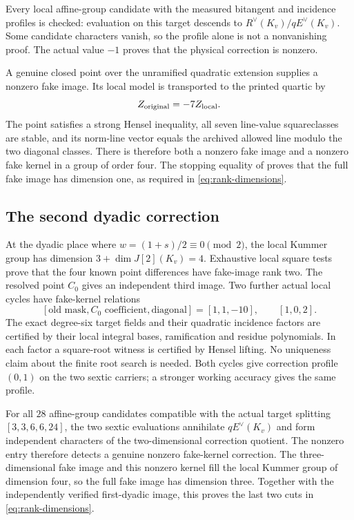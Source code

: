 Every local affine-group candidate with the measured bitangent and
incidence profiles is checked: evaluation on this target descends to
$R^\vee(K_v)/qE^\vee(K_v)$.  Some candidate characters vanish, so the
profile alone is not a nonvanishing proof.  The actual value $-1$ proves
that the physical correction is nonzero.

A genuine closed point over the unramified quadratic extension supplies
a nonzero fake image.  Its local model is transported to the printed
quartic by
\[
                         Z_{\rm original}=-7Z_{\rm local}.
\]
The point satisfies a strong Hensel inequality, all seven line-value
squareclasses are stable, and its norm-line vector equals the archived
allowed line modulo the two diagonal classes.  There is therefore both a
nonzero fake image and a nonzero fake kernel in a group of order four.
The stopping equality of \cite[Lemma~A.24(b)]{BPS} proves that the full
fake image has dimension one, as required in
\eqref{eq:rank-dimensions}.

\subsection{The second dyadic correction}

At the dyadic place where $w=(1+s)/2\equiv0\pmod2$, the local Kummer
group has dimension $3+\dim J[2](K_v)=4$.  Exhaustive local square tests
prove that the four known point differences have fake-image rank two.
The resolved point $C_0$ gives an independent third image.  Two further
actual local cycles have fake-kernel relations
\[
 [\text{old mask},C_0\text{ coefficient},\text{diagonal}]
             =[1,1,-10],\qquad [1,0,2].
\]
The exact degree-six target fields and their quadratic incidence factors
are certified by their local integral bases, ramification and residue
polynomials.  In each factor a square-root witness is certified by Hensel
lifting.  No uniqueness claim about the finite root search is needed.
Both cycles give correction profile $(0,1)$ on the two sextic carriers;
a stronger working accuracy gives the same profile.

For all $28$ affine-group candidates compatible with the actual target
splitting $[3,3,6,6,24]$, the two sextic evaluations annihilate
$qE^\vee(K_v)$ and form independent characters of the two-dimensional
correction quotient.  The nonzero entry therefore detects a genuine
nonzero fake-kernel correction.  The three-dimensional fake image and
this nonzero kernel fill the local Kummer group of dimension four, so the
full fake image has dimension three.  Together with the independently
verified first-dyadic image, this proves the last two cuts in
\eqref{eq:rank-dimensions}.

